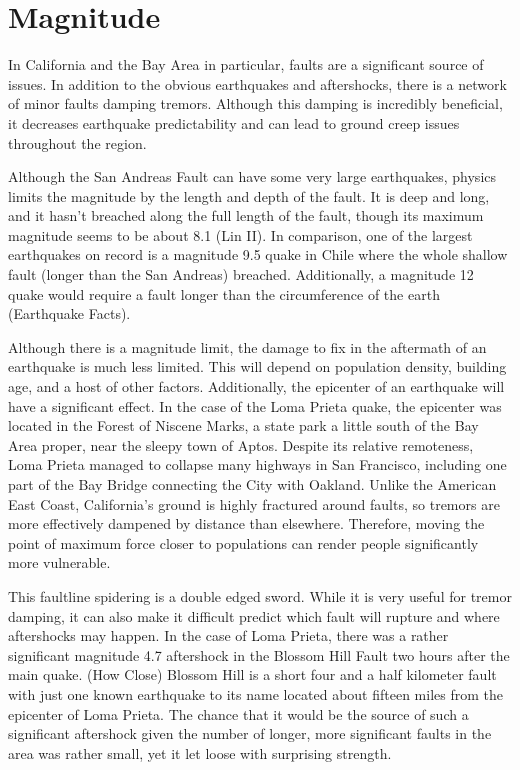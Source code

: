 \documentclass[12pt]{article}
\begin{document}
\section*{Magnitude}
In California and the Bay Area in particular, faults are a significant source of issues.  In addition to the obvious earthquakes and aftershocks, there is a network of minor faults damping tremors.  Although this damping is incredibly beneficial, it decreases earthquake predictability and can lead to ground creep issues throughout the region.

Although the San Andreas Fault can have some very large earthquakes, physics limits the magnitude by the length and depth of the fault.  It is deep and long, and it hasn't breached along the full length of the fault, though its maximum magnitude seems to be about 8.1 (Lin \textrm{II}).  In comparison, one of the largest earthquakes on record is a magnitude 9.5 quake in Chile where the whole shallow fault (longer than the San Andreas) breached. Additionally, a magnitude 12 quake would require a fault longer than the circumference of the earth (Earthquake Facts).

Although there is a magnitude limit, the damage to fix in the aftermath of an earthquake is much less limited.  This will depend on population density, building age, and a host of other factors.  Additionally, the epicenter of an earthquake will have a significant effect.  In the case of the Loma Prieta quake, the epicenter was located in the Forest of Niscene Marks, a state park a little south of the Bay Area proper, near the sleepy town of Aptos.  Despite its relative remoteness, Loma Prieta managed to collapse many highways in San Francisco, including one part of the Bay Bridge connecting the City with Oakland.  Unlike the American East Coast, California's ground is highly fractured around faults, so tremors are more effectively dampened by distance than elsewhere.  Therefore, moving the point of maximum force closer to populations can render people significantly more vulnerable.  

This faultline spidering is a double edged sword.  While it is very useful for tremor damping, it can also make it difficult predict which fault will rupture and where aftershocks may happen.  In the case of Loma Prieta, there was a rather significant magnitude 4.7 aftershock in the Blossom Hill Fault two hours after the main quake. (How Close)  Blossom Hill is a short four and a half kilometer fault with just one known earthquake to its name located about fifteen miles from the epicenter of Loma Prieta.  The chance that it would be the source of such a significant aftershock given the number of longer, more significant faults in the area was rather small, yet it let loose with surprising strength.
\end{document}
